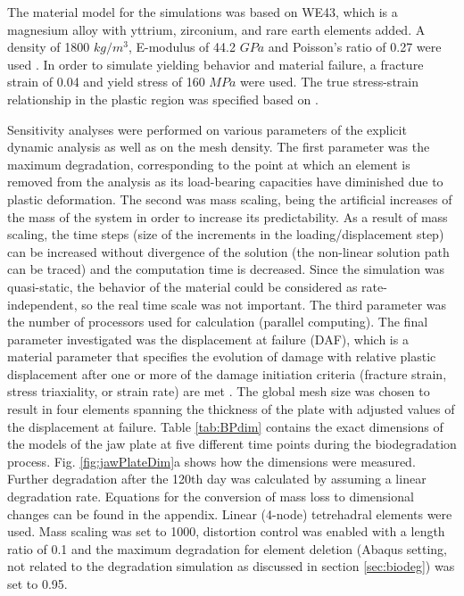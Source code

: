 The material model for the simulations was based on WE43, which is a magnesium alloy with yttrium, zirconium, and rare earth elements added. A density of 1800 $kg/m^3$, E-modulus of 44.2 $GPa$ and Poisson's ratio of 0.27 were used \cite{Agarwal2016}. In order to simulate yielding behavior and material failure, a fracture strain of 0.04 and yield stress of 160 $MPa$ were used. The true stress-strain relationship in the plastic region was specified based on \cite{WE43}.

Sensitivity analyses were performed on various parameters of the explicit dynamic analysis as well as on the mesh density. The first parameter was the maximum degradation, corresponding to the point at which an element is removed from the analysis as its load-bearing capacities have diminished due to plastic deformation. The second was mass scaling, being the artificial increases of the mass of the system in order to increase its predictability. As a result of mass scaling, the time steps (size of the increments in the loading/displacement step) can be increased without divergence of the solution (the non-linear solution path can be traced) and the computation time is decreased. Since the simulation was quasi-static, the behavior of the material could be considered as rate-independent, so the real time scale was not important. The third parameter was the number of processors used for calculation (parallel computing). The final parameter investigated was the displacement at failure (DAF), which is a material parameter that specifies the evolution of damage with relative plastic displacement after one or more of the damage initiation criteria (fracture strain, stress triaxiality, or strain rate) are met \cite{daf,daf2}. The global mesh size was chosen to result in four elements spanning the thickness of the plate with adjusted values of the displacement at failure. Table \ref{tab:BPdim} contains the exact dimensions of the models of the jaw plate at five different time points during the biodegradation process. Fig. \ref{fig:jawPlateDim}a shows how the dimensions were measured. Further degradation after the 120th day was calculated by assuming a linear degradation rate. Equations for the conversion of mass loss to dimensional changes can be found in the appendix. Linear (4-node) tetrehadral elements were used. Mass scaling was set to 1000, distortion control was enabled with a length ratio of 0.1 and the maximum degradation for element deletion (Abaqus setting, not related to the degradation simulation as discussed in section \ref{sec:biodeg}) was set to 0.95.


